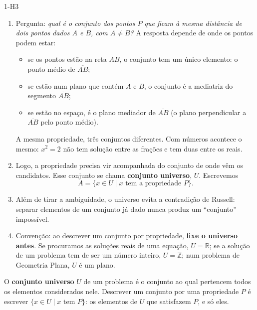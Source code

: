 \begin{construcao}{1-H3}
\begin{enumerate}[label=(\arabic*)]
  \item Pergunta: \emph{qual é o conjunto dos pontos $P$ que ficam à mesma distância de dois pontos dados $A$ e $B$, com $A\neq B$?} A resposta depende de onde os pontos podem estar:
\begin{itemize}[leftmargin=1.2em,itemsep=0pt]
  \item se os pontos estão na reta $AB$, o conjunto tem um único elemento: o ponto médio de $\overline{AB}$;
  \item se estão num plano que contém $A$ e $B$, o conjunto é a mediatriz do segmento $\overline{AB}$;
  \item se estão no espaço, é o plano mediador de $\overline{AB}$ (o plano perpendicular a $\overline{AB}$ pelo ponto médio).
\end{itemize}
A mesma propriedade, três conjuntos diferentes. Com números acontece o mesmo: $x^2=2$ não tem solução entre as frações e tem duas entre os reais.
  \item Logo, a propriedade precisa vir acompanhada do conjunto de onde vêm os candidatos. Esse conjunto se chama \textbf{conjunto universo}, $U$. Escrevemos
\[
A=\{x\in U\mid x \text{ tem a propriedade } P\}.
\]
  \item Além de tirar a ambiguidade, o universo evita a contradição de Russell: separar elementos de um conjunto já dado nunca produz um \enquote{conjunto} impossível.
  \item Convenção: ao descrever um conjunto por propriedade, \textbf{fixe o universo antes}. Se procuramos as soluções reais de uma equação, $U=\mathbb{R}$; se a solução de um problema tem de ser um número inteiro, $U=\mathbb{Z}$; num problema de Geometria Plana, $U$ é um plano.
\end{enumerate}
\end{construcao}

\begin{definicao}
O \textbf{conjunto universo} $U$ de um problema é o conjunto ao qual pertencem todos os elementos considerados nele. Descrever um conjunto por uma propriedade $P$ é escrever $\{x\in U\mid x\text{ tem }P\}$: os elementos de $U$ que satisfazem $P$, e só eles.
\end{definicao}

